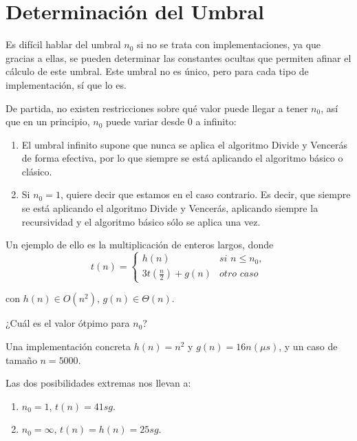 \documentclass[10pt,a4paper,spanish]{report}
\theoremstyle{definition}
\theoremstyle{remark}
\begin{document}
\section{\textcolor[rgb]{0.2,0.5,0.5}Determinación del Umbral}

Es difícil hablar del umbral \textcolor[rgb]{0.2,0.5,0.5}{$n_0$} si no se trata con implementaciones, ya que gracias a ellas, se pueden determinar las constantes ocultas que permiten afinar el cálculo de este umbral. Este umbral no es único, pero para cada tipo de implementación, sí que lo es.

De partida, no existen restricciones sobre qué valor puede llegar a tener \textcolor[rgb]{0.2,0.5,0.5}{$n_0$}, así que en un principio, \textcolor[rgb]{0.2,0.5,0.5}{$n_0$} puede variar desde 0 a infinito:

\begin{enumerate}
    \item El umbral infinito supone que nunca se aplica el algoritmo \textcolor[rgb]{0.2,0.5,0.5}{Divide y Vencerás} de forma efectiva, por lo que siempre se está aplicando el algoritmo básico o clásico.
    \item Si $n_0 = 1$, quiere decir que estamos en el caso contrario. Es decir, que siempre se está aplicando el algoritmo \textcolor[rgb]{0.2,0.5,0.5}{Divide y Vencerás}, aplicando siempre la recursividad y el algoritmo básico sólo se aplica una vez.
\end{enumerate}

Un ejemplo de ello es la multiplicación de enteros largos, donde
\begin{equation*}
t(n) = 
\begin{cases}
h(n) & \textit{si } n \leq n_0, \\
3t(\frac{n}{2}) + g(n) & \textit{otro caso}
\end{cases}
\end{equation*}

con $h(n) \in O(n^2)$, $g(n) \in \Theta(n)$.

¿Cuál es el valor ótpimo para $n_0$?

Una implementación concreta $h(n) = n^2$ y $g(n) = 16n (\mu s)$, y un caso de tamaño $n=5000$.

Las dos posibilidades extremas nos llevan a:

\begin{enumerate}
    \item $n_0 = 1$, $t(n) = 41sg$.
    \item $n_0 = \infty$, $t(n) = h(n) = 25sg$.
\end{enumerate}
\end{document}
